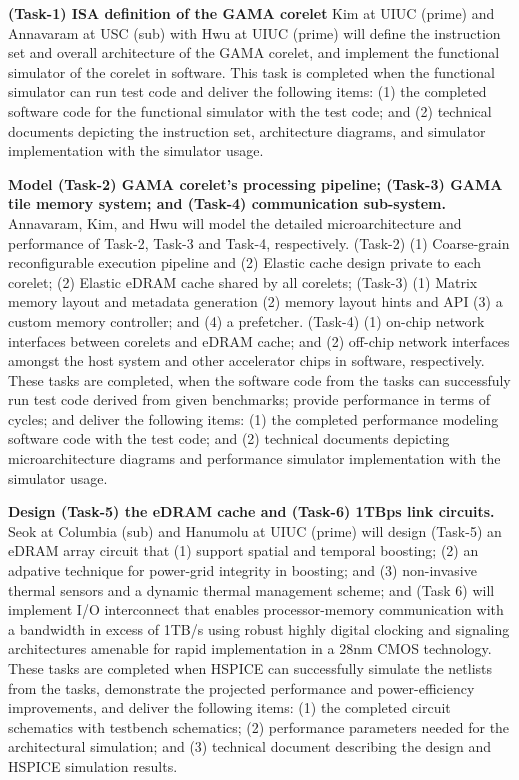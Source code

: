 \noindent
\textbf{(Task-1) ISA definition of the GAMA corelet} 
Kim at UIUC (prime) and Annavaram at USC (sub) with Hwu at UIUC (prime) will define the instruction set and overall architecture of the GAMA corelet, and implement the functional simulator of the corelet in software.
This task is completed when the functional simulator can run test code and deliver the following items: 
(1) the completed software code for the functional simulator with the test code; and (2) technical documents depicting the instruction set, architecture diagrams, and simulator implementation with the simulator usage.


\noindent
\textbf{Model (Task-2) GAMA corelet's processing pipeline; (Task-3) GAMA tile memory system; and (Task-4) communication sub-system.}
Annavaram, Kim, and Hwu will model the detailed microarchitecture and performance of Task-2, Task-3 and Task-4, respectively.  
(Task-2) (1) Coarse-grain reconfigurable execution pipeline and (2) Elastic cache design private to each corelet; (2) Elastic eDRAM cache shared by all corelets; 
(Task-3) (1) Matrix memory layout and metadata generation (2) memory layout hints and API (3) a custom memory controller; and (4) a prefetcher.
(Task-4) (1) on-chip network interfaces between corelets and eDRAM cache; and (2) off-chip network interfaces amongst the host system and other accelerator chips in software, respectively.
These tasks are completed, when the software code from the tasks can successfuly run test code derived from given benchmarks; provide performance in terms of cycles; and deliver the following items:
(1) the completed performance modeling software code with the test code; and (2) technical documents depicting microarchitecture diagrams and performance simulator implementation with the simulator usage.


\noindent
\textbf{Design (Task-5) the eDRAM cache and (Task-6) 1TBps link circuits.}
Seok at Columbia (sub) and Hanumolu at UIUC (prime) will design 
(Task-5) an eDRAM array circuit that (1) support spatial and temporal boosting; (2) an adpative technique for power-grid integrity in boosting; and (3) non-invasive thermal sensors and a dynamic thermal management scheme; and 
(Task 6) will implement I/O interconnect that enables processor-memory communication with a bandwidth in excess of 1TB/s using robust highly digital clocking and signaling architectures amenable for rapid implementation in a 28nm CMOS technology.
These tasks are completed when HSPICE can successfully simulate the netlists from the tasks, demonstrate the projected performance and power-efficiency improvements, and deliver the following items:
(1) the completed circuit schematics with testbench schematics; (2) performance parameters needed for the architectural simulation; and (3) technical document describing the design and HSPICE simulation results.


